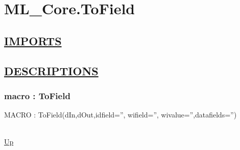\chapter*{ML\_Core.ToField}
\hypertarget{ML_Core.ToField}{}

\section*{\underline{IMPORTS}}

\section*{\underline{DESCRIPTIONS}}
\subsection*{macro : ToField}
\hypertarget{ecldoc:ml_core.tofield}{MACRO : ToField(dIn,dOut,idfield='', wifield='', wivalue='',datafields='')} \\
\hyperlink{ecldoc:}{Up} \\
\par
